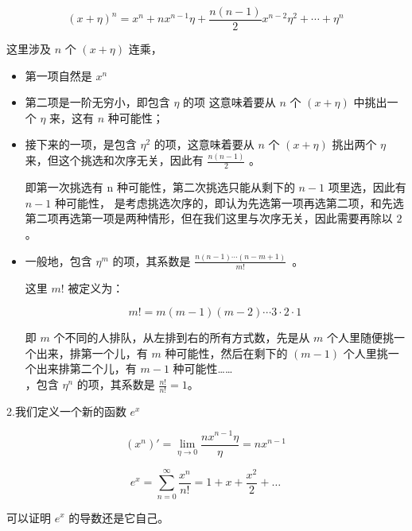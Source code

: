 \begin{equation}
(x + \eta)^n = x^n + nx^{n-1}\eta + \frac{n(n-1)}{2} x^{n-2} \eta^2 + \cdots + \eta^n~
\end{equation}

这里涉及 $n$ 个 $(x + \eta)$ 连乘，

\begin{itemize}
\item  第⼀项自然是 $x^n$

\item 第⼆项是⼀阶⽆穷小，即包含 $\eta$ 的项 这意味着要从  $n$ 个 $(x + \eta)$ 中挑出⼀个 $\eta$ 来，这有 $n$ 种可能性；

\item 接下来的⼀项，是包含 $\eta^2$ 的项，这意味着要从 $n$ 个 $(x + \eta)$ 挑出两个 $\eta$ 来，但这个挑选和次序⽆关，因此有 $\frac{n\left(n-1 \right)}{2}$ 。

即第⼀次挑选有 n 种可能性，第⼆次挑选只能从剩下的 $n - 1$ 项里选，因此有 $n - 1$ 种可能性，
是考虑挑选次序的，即认为先选第⼀项再选第⼆项，和先选第⼆项再选第⼀项是两种情形，但在我们这里与次序⽆关，因此需要再除以 $2$ 。

\item 一般地，包含 $\eta^m$ 的项，其系数是 $\frac{n(n-1)\cdots(n-m+1)}{m!}$~。

这里 $m!$ 被定义为：

\begin{equation}
m! = m(m-1)(m-2)\cdots3 \cdot 2 \cdot 1 \tag{39}~
\end{equation}

即 $m$ 个不同的人排队，从左排到右的所有方式数，先是从 $m$ 个人里随便挑一个出来，排第一个儿，有 $m$ 种可能性，然后在剩下的 $(m-1)$ 个人里挑一个出来排第二个儿，有 $m-1$ 种可能性……\\

，包含 $\eta^n$ 的项，其系数是 $\frac{n!}{n!} = 1$。
\end{itemize}

2.我们定义⼀个新的函数 $e^x$

\begin{equation}
(x^n)' = \lim_{\eta \to 0} \frac{n x^{n-1} \eta}{\eta} = n x^{n-1}~
\end{equation}

\begin{equation}
e^x = \sum_{n=0}^{\infty} \frac{x^n}{n!} = 1 + x + \frac{x^2}{2} + \ldots~
\end{equation}

可以证明 $e^x$ 的导数还是它自己。

